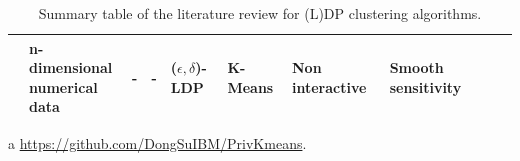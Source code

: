 \begin{landscape}
\begin{table}[ht]
\begin{threeparttable}
\begin{tabular}{rlllllllll}
        \citep{nissim_smooth_2007}                 & \makecell[l]{n-dimensional                                                                                                                          \\ numerical data}             & -                                                  & -                                                  & ($\epsilon, \delta$)-LDP & K-Means             & Non interactive & Smooth sensitivity               \\
        \bottomrule
      \end{tabular}
      \begin{tablenotes}
        \item[a] \url{https://github.com/DongSuIBM/PrivKmeans}.
      \end{tablenotes}
    \end{threeparttable}

    \caption{Summary table of the literature review for (L)DP clustering algorithms.}
    \label{tab:summary_table_kmeans}
  \end{table}



\end{landscape}
